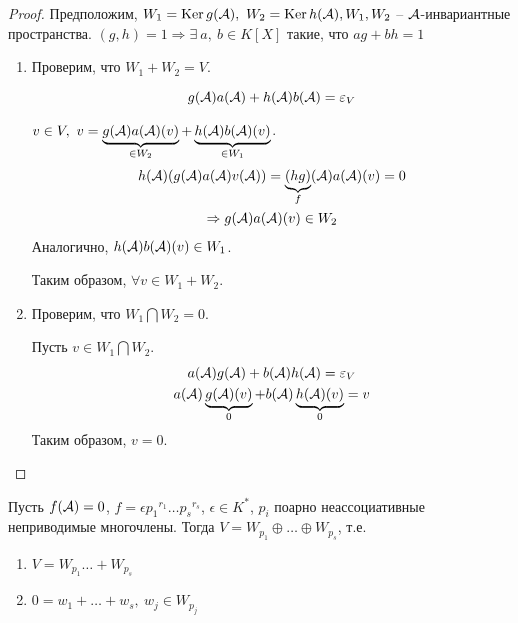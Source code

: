 \documentclass[main]{subfiles}
\begin{document}
\begin{proof}
    Предположим, $W_1 = \operatorname{Ker} g(\mathcal{A}), \ W_2 = \operatorname{Ker} h(\mathcal{A}),
        W_1, W_2$ -- $\mathcal{A}$-инвариантные пространства.
    $(g, h) = 1 \Rightarrow \exists \ a, \ b \in K[X]$ такие, что $ag+bh = 1$

    \begin{enumerate}
        \item Проверим, что $W_1 + W_2 = V$.

              \[g(\mathcal{A})a(\mathcal{A}) + h(\mathcal{A})b(\mathcal{A}) = \varepsilon_V\]

              $v \in V, \ v = \underbrace{g(\mathcal{A})a(\mathcal{A})(v)}_{\in W_2} + \underbrace{h(\mathcal{A})b(\mathcal{A})(v)}_{\in W_1}$.
              \begin{gather*}
                  h(\mathcal{A})(g(\mathcal{A})a(\mathcal{A})v(\mathcal{A})) = \underbrace{(hg)}_{f}(\mathcal{A})a(\mathcal{A})(v) = 0 \\
                  \Rightarrow g(\mathcal{A})a(\mathcal{A})(v) \in W_2
              \end{gather*}
              Аналогично, $h(\mathcal{A})b(\mathcal{A})(v) \in W_1$.

              Таким образом, $\forall v \in W_1 + W_2$.
        \item Проверим, что $W_1 \bigcap W_2 = 0$.

              Пусть $v \in W_1 \bigcap W_2$.
              \begin{gather*}
                  a(\mathcal{A})g(\mathcal{A}) + b(\mathcal{A})h(\mathcal{A}) = \varepsilon_V \\
                  a(\mathcal{A})\underbrace{g(\mathcal{A})(v)}_{0} + b(\mathcal{A})\underbrace{h(\mathcal{A})(v)}_{0} = v
              \end{gather*}
              Таким образом, $v = 0$.
    \end{enumerate}
\end{proof}

\begin{proposition}
    Пусть $f(\mathcal{A}) = 0$, $f = \epsilon {p_1}^{r_1} \ldots {p_s}^{r_s}$, $\epsilon \in K^*$,
    $p_i$ поарно неассоциативные неприводимые многочлены. Тогда $V = W_{p_1} \oplus \ldots \oplus W_{p_s}$, т.е.
    \begin{enumerate}
        \item $V = W_{p_1} \ldots + W_{p_s}$
        \item $ 0 = w_1 + \ldots + w_s, \ w_j \in W_{p_j}$
    \end{enumerate}
\end{proposition}
\end{document}

